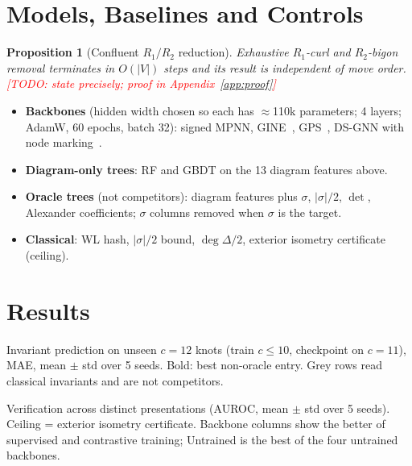 \documentclass{article}
\newcommand{\todo}[1]{\textcolor{red}{[TODO: #1]}}
\newtheorem{proposition}{Proposition}
\begin{document}
\section{Models, Baselines and Controls}\label{sec:models}
\begin{proposition}[Confluent $R_1/R_2$ reduction]
Exhaustive $R_1$-curl and $R_2$-bigon removal terminates in $O(|V|)$ steps and
its result is independent of move order. \todo{state precisely; proof in
Appendix~\ref{app:proof}}
\end{proposition}
\begin{itemize}[leftmargin=*,itemsep=1pt]
  \item \textbf{Backbones} (hidden width chosen so each has $\approx$110k
        parameters; 4 layers; AdamW, 60 epochs, batch 32): signed MPNN,
        GINE~\cite{xu2019powerful}, GPS~\cite{rampasek2022gps}, DS-GNN with
        node marking~\cite{bevilacqua2022equivariant}.
  \item \textbf{Diagram-only trees}: RF and GBDT on the 13 diagram features above.
  \item \textbf{Oracle trees} (not competitors): diagram features plus
        $\sigma$, $|\sigma|/2$, $\det$, Alexander coefficients; $\sigma$ columns
        removed when $\sigma$ is the target.
  \item \textbf{Classical}: WL hash, $|\sigma|/2$ bound, $\deg\Delta/2$, exterior
        isometry certificate (ceiling).
\end{itemize}

\section{Results}\label{sec:results}

\begin{table}[t]
\centering\small
\caption{Invariant prediction on unseen $c{=}12$ knots (train $c{\le}10$,
checkpoint on $c{=}11$), MAE, mean $\pm$ std over 5 seeds. Bold: best non-oracle
entry. Grey rows read classical invariants and are not competitors.}
\label{tab:task2}
\begin{adjustbox}{max width=\linewidth}

\end{adjustbox}
\end{table}

\begin{table}[t]
\centering\small
\caption{Verification across distinct presentations (AUROC, mean $\pm$ std over
5 seeds). Ceiling = exterior isometry certificate. Backbone columns show the
better of supervised and contrastive training; Untrained is the best of the four
untrained backbones.}
\label{tab:task1}
\begin{adjustbox}{max width=\linewidth}

\end{adjustbox}
\end{table}
\end{document}
